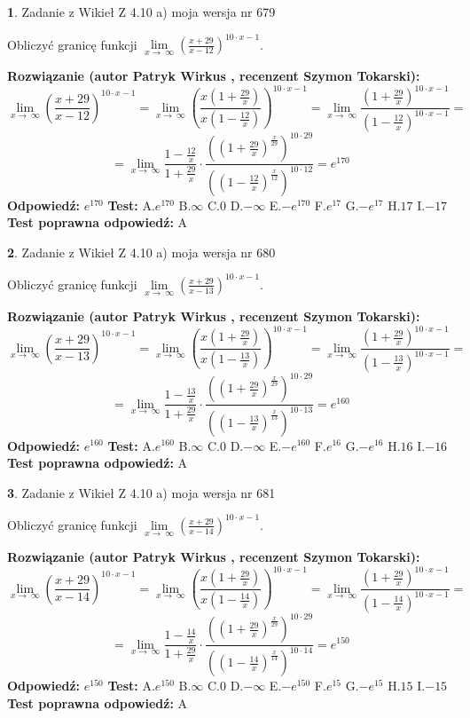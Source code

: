 \documentclass[12pt, a4paper]{article}
\theoremstyle{definition} %
\newtheorem{zad}{}
\newcommand{\zadStart}[1]{\begin{zad}#1\newline}
\newcommand{\zadStop}{\end{zad}}
\newcommand{\rozwStart}[2]{\noindent \textbf{Rozwiązanie (autor #1 , recenzent #2): }\newline}
\newcommand{\rozwStop}{\newline}
\newcommand{\odpStart}{\noindent \textbf{Odpowiedź:}\newline}
\newcommand{\odpStop}{\newline}
\newcommand{\testStart}{\noindent \textbf{Test:}\newline}
\newcommand{\testStop}{\newline}
\newcommand{\kluczStart}{\noindent \textbf{Test poprawna odpowiedź:}\newline}
\newcommand{\kluczStop}{\newline}
\begin{document}
\zadStart{Zadanie z Wikieł Z 4.10 a) moja wersja nr 679}

Obliczyć granicę funkcji  $\lim\limits_{x\to\ \infty}(\frac{x+29}{x-12})^{10\cdot x-1}$.
\zadStop
\rozwStart{Patryk Wirkus}{Szymon Tokarski}
$$\lim\limits_{x\to\ \infty}(\frac{x+29}{x-12})^{10\cdot x-1} = \lim\limits_{x\to\ \infty}(\frac{x(1+\frac{29}{x})}{x(1-\frac{12}{x})})^{10\cdot x-1}=\lim\limits_{x\to\ \infty}\frac{(1+\frac{29}{x})^{10\cdot x-1}}{(1-\frac{12}{x})^{10\cdot x-1}}=$$
$$=\lim\limits_{x\to\ \infty}\frac{1-\frac{12}{x}}{1+\frac{29}{x}}\cdot\frac{((1+\frac{29}{x})^{\frac{x}{29}})^{10\cdot29}}{((1-\frac{12}{x})^{\frac{x}{12}})^{10\cdot12}}=e^{170}$$
\rozwStop
\odpStart
$e^{170}$
\odpStop
\testStart
A.$e^{170}$ B.$\infty$ C.$0$ D.$-\infty$ E.$-e^{170}$
F.$e^{17}$ G.$-e^{17}$
H.$17$
I.$-17$
\testStop
\kluczStart
A
\kluczStop



\zadStart{Zadanie z Wikieł Z 4.10 a) moja wersja nr 680}

Obliczyć granicę funkcji  $\lim\limits_{x\to\ \infty}(\frac{x+29}{x-13})^{10\cdot x-1}$.
\zadStop
\rozwStart{Patryk Wirkus}{Szymon Tokarski}
$$\lim\limits_{x\to\ \infty}(\frac{x+29}{x-13})^{10\cdot x-1} = \lim\limits_{x\to\ \infty}(\frac{x(1+\frac{29}{x})}{x(1-\frac{13}{x})})^{10\cdot x-1}=\lim\limits_{x\to\ \infty}\frac{(1+\frac{29}{x})^{10\cdot x-1}}{(1-\frac{13}{x})^{10\cdot x-1}}=$$
$$=\lim\limits_{x\to\ \infty}\frac{1-\frac{13}{x}}{1+\frac{29}{x}}\cdot\frac{((1+\frac{29}{x})^{\frac{x}{29}})^{10\cdot29}}{((1-\frac{13}{x})^{\frac{x}{13}})^{10\cdot13}}=e^{160}$$
\rozwStop
\odpStart
$e^{160}$
\odpStop
\testStart
A.$e^{160}$ B.$\infty$ C.$0$ D.$-\infty$ E.$-e^{160}$
F.$e^{16}$ G.$-e^{16}$
H.$16$
I.$-16$
\testStop
\kluczStart
A
\kluczStop



\zadStart{Zadanie z Wikieł Z 4.10 a) moja wersja nr 681}

Obliczyć granicę funkcji  $\lim\limits_{x\to\ \infty}(\frac{x+29}{x-14})^{10\cdot x-1}$.
\zadStop
\rozwStart{Patryk Wirkus}{Szymon Tokarski}
$$\lim\limits_{x\to\ \infty}(\frac{x+29}{x-14})^{10\cdot x-1} = \lim\limits_{x\to\ \infty}(\frac{x(1+\frac{29}{x})}{x(1-\frac{14}{x})})^{10\cdot x-1}=\lim\limits_{x\to\ \infty}\frac{(1+\frac{29}{x})^{10\cdot x-1}}{(1-\frac{14}{x})^{10\cdot x-1}}=$$
$$=\lim\limits_{x\to\ \infty}\frac{1-\frac{14}{x}}{1+\frac{29}{x}}\cdot\frac{((1+\frac{29}{x})^{\frac{x}{29}})^{10\cdot29}}{((1-\frac{14}{x})^{\frac{x}{14}})^{10\cdot14}}=e^{150}$$
\rozwStop
\odpStart
$e^{150}$
\odpStop
\testStart
A.$e^{150}$ B.$\infty$ C.$0$ D.$-\infty$ E.$-e^{150}$
F.$e^{15}$ G.$-e^{15}$
H.$15$
I.$-15$
\testStop
\kluczStart
A
\kluczStop
\end{document}
